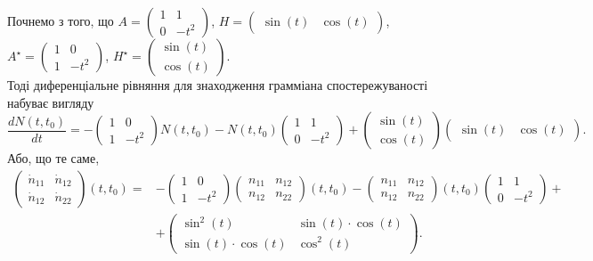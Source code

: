 \begin{solution}
    Почнемо з того, що $A = \begin{pmatrix} 1 & 1 \\ 0 & -t^2 \end{pmatrix}$, $H = \begin{pmatrix} \sin(t) & \cos(t) \end{pmatrix}$, $A^\star = \begin{pmatrix} 1 & 0 \\ 1 & -t^2 \end{pmatrix}$, $H^\star = \begin{pmatrix} \sin(t) \\ \cos(t) \end{pmatrix}$.\\
    
    Тоді диференціальне рівняння для знаходження грамміана спостережуваності набуває вигляду
    \[ \dfrac{dN(t, t_0)}{dt} = -\begin{pmatrix} 1 & 0 \\ 1 & -t^2 \end{pmatrix} N(t, t_0) - N(t, t_0) \begin{pmatrix} 1 & 1 \\ 0 & -t^2 \end{pmatrix} + \begin{pmatrix} \sin(t) \\ \cos(t) \end{pmatrix} \begin{pmatrix} \sin(t) & \cos(t) \end{pmatrix}. \]
    Або, що те саме,
    \begin{align*}
        \begin{pmatrix} \dot n_{11} & \dot n_{12} \\ \dot n_{12} & \dot n_{22} \end{pmatrix} (t, t_0) = &-\begin{pmatrix} 1 & 0 \\ 1 & -t^2 \end{pmatrix} \begin{pmatrix} n_{11} & n_{12} \\ n_{12} & n_{22} \end{pmatrix} (t, t_0) - \begin{pmatrix} n_{11} & n_{12} \\ n_{12} & n_{22} \end{pmatrix}(t, t_0) \begin{pmatrix} 1 & 1 \\ 0 & -t^2 \end{pmatrix} + \\
        &+ \begin{pmatrix} \sin^2(t) & \sin(t)\cdot \cos(t) \\ \sin(t) \cdot \cos(t) & \cos^2(t) \end{pmatrix}.
    \end{align*} 
    

\end{solution}
